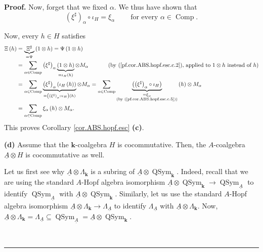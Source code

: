 \documentclass
[numbers=enddot,12pt,final,onecolumn,notitlepage,abstracton]{scrartcl}%
\theoremstyle{definition}
\newenvironment{proof}[1][Proof]{\noindent\textbf{#1.} }{\ \rule{0.5em}{0.5em}}
\let\sumnonlimits\sum
\renewcommand{\sum}{\sumnonlimits\limits}
\begin{document}
\begin{proof}
Now, forget that we fixed $\alpha$. We thus have shown that%
\begin{equation}
\left(  \xi^{\sharp}\right)  _{\alpha}\circ\iota_{H}=\xi_{\alpha
}\ \ \ \ \ \ \ \ \ \ \text{for every }\alpha\in\operatorname*{Comp}.
\label{pf.cor.ABS.hopf.esc.c.5}%
\end{equation}


Now, every $h\in H$ satisfies%
\begin{align*}
\Xi\left(  h\right)   &  =\underbrace{\Xi^{\sharp}}_{=\Psi}\left(  1\otimes
h\right)  =\Psi\left(  1\otimes h\right) \\
&  =\sum_{\alpha\in\operatorname*{Comp}}\left(  \xi^{\sharp}\right)  _{\alpha
}\underbrace{\left(  1\otimes h\right)  }_{=\iota_{H}\left(  h\right)
}\otimes M_{\alpha}\ \ \ \ \ \ \ \ \ \ \left(  \text{by
(\ref{pf.cor.ABS.hopf.esc.c.2}), applied to }1\otimes h\text{ instead of
}h\right) \\
&  =\sum_{\alpha\in\operatorname*{Comp}}\underbrace{\left(  \xi^{\sharp
}\right)  _{\alpha}\left(  \iota_{H}\left(  h\right)  \right)  }_{=\left(
\left(  \xi^{\sharp}\right)  _{\alpha}\circ\iota_{H}\right)  \left(  h\right)
}\otimes M_{\alpha}=\sum_{\alpha\in\operatorname*{Comp}}\underbrace{\left(
\left(  \xi^{\sharp}\right)  _{\alpha}\circ\iota_{H}\right)  }_{\substack{=\xi
_{\alpha}\\\text{(by (\ref{pf.cor.ABS.hopf.esc.c.5}))}}}\left(  h\right)
\otimes M_{\alpha}\\
&  =\sum_{\alpha\in\operatorname*{Comp}}\xi_{\alpha}\left(  h\right)  \otimes
M_{\alpha}.
\end{align*}
This proves Corollary \ref{cor.ABS.hopf.esc} \textbf{(c)}.

\textbf{(d)} Assume that the $\mathbf{k}$-coalgebra $H$ is cocommutative.
Then, the $A$-coalgebra $\underline{A}\otimes H$ is cocommutative as well.

Let us first see why $\underline{A}\otimes\Lambda_{\mathbf{k}}$ is a subring
of $\underline{A}\otimes\operatorname*{QSym}\nolimits_{\mathbf{k}}$. Indeed,
recall that we are using the standard $A$-Hopf algebra isomorphism
$\underline{A}\otimes\operatorname*{QSym}\nolimits_{\mathbf{k}}\rightarrow
\operatorname*{QSym}\nolimits_{\underline{A}}$ to identify
$\operatorname*{QSym}\nolimits_{\underline{A}}$ with $\underline{A}%
\otimes\operatorname*{QSym}\nolimits_{\mathbf{k}}$. Similarly, let us use the
standard $A$-Hopf algebra isomorphism $\underline{A}\otimes\Lambda
_{\mathbf{k}}\rightarrow\Lambda_{\underline{A}}$ to identify $\Lambda
_{\underline{A}}$ with $\underline{A}\otimes\Lambda_{\mathbf{k}}$. Now,
$\underline{A}\otimes\Lambda_{\mathbf{k}}=\Lambda_{\underline{A}}%
\subseteq\operatorname*{QSym}\nolimits_{\underline{A}}=\underline{A}%
\otimes\operatorname*{QSym}\nolimits_{\mathbf{k}}$.


\end{proof}
\end{document}
